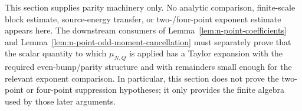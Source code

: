 \begin{remark}
\label{rem:n-point-scope}
This section supplies parity machinery only.  No analytic comparison,
finite-scale block estimate, source-energy transfer, or two-/four-point
exponent estimate appears here.  The downstream consumers of
Lemma~\ref{lem:n-point-coefficients} and
Lemma~\ref{lem:n-point-odd-moment-cancellation} must separately prove
that the scalar quantity to which \(\mu_{N,Q}\) is applied has a Taylor
expansion with the required even-bump/parity structure and with
remainders small enough for the relevant exponent comparison.  In
particular, this section does not prove the two-point or four-point
suppression hypotheses; it only provides the finite algebra used by those
later arguments.
\end{remark}
